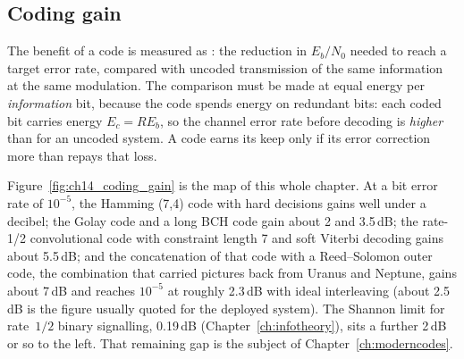 

\subsection{Coding gain}

The benefit of a code is measured as : the reduction in $E_b/N_0$ needed to reach
a target error rate, compared with uncoded transmission of the same information at the same
modulation. The comparison must be made at equal energy per \emph{information} bit, because the code
spends energy on redundant bits: each coded bit carries energy $E_c=RE_b$, so the channel error rate
before decoding is \emph{higher} than for an uncoded system. A code earns its keep only if its error
correction more than repays that loss.

Figure~\ref{fig:ch14_coding_gain} is the map of this whole chapter. At a bit error rate of
$10^{-5}$, the Hamming (7,4) code with hard decisions gains well under a decibel; the Golay code and a
long BCH code gain about 2 and 3.5\,dB; the rate-1/2 convolutional code with constraint length 7 and
soft Viterbi decoding gains about 5.5\,dB; and the concatenation of that code with a Reed--Solomon
outer code, the combination that carried pictures back from Uranus and Neptune, gains about 7\,dB and
reaches $10^{-5}$ at roughly 2.3\,dB with ideal interleaving (about 2.5\,dB is the figure usually
quoted for the deployed system). The Shannon limit for rate~$1/2$ binary signalling, 0.19\,dB
(Chapter~\ref{ch:infotheory}), sits a further 2\,dB or so to the left. That remaining gap is the
subject of Chapter~\ref{ch:moderncodes}.


